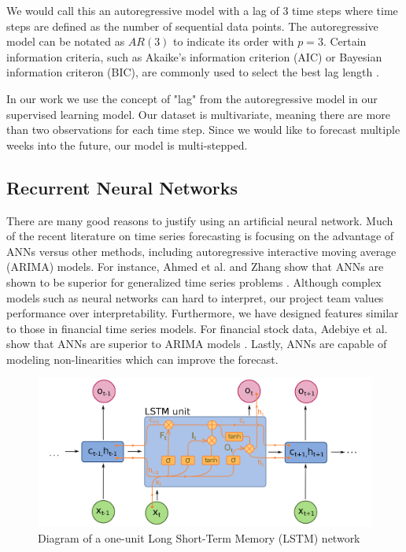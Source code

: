 \documentclass[11pt, oneside]{report}
\begin{document}
We would call this an autoregressive model with a lag of 3 time steps where time steps are defined as the number of sequential data points. The autoregressive model can be notated as $AR(3)$ to indicate its order with $p=3$. Certain information criteria, such as Akaike's information criterion (AIC) or Bayesian information criteron (BIC), are commonly used to select the best lag length \cite{liew}.

In our work we use the concept of "lag" from the autoregressive model in our supervised learning model. Our dataset is multivariate, meaning there are more than two observations for each time step. Since we would like to forecast multiple weeks into the future, our model is multi-stepped.

\subsection{Recurrent Neural Networks}

There are many good reasons to justify using an artificial neural network. Much of the recent literature on time series forecasting is focusing on the advantage of ANNs versus other methods, including autoregressive interactive moving average (ARIMA) models. For instance, Ahmed et al. and Zhang show that ANNs are shown to be superior for generalized time series problems \cite{ahmed}. Although complex models such as neural networks can hard to interpret, our project team values performance over interpretability. Furthermore, we have designed features similar to those in financial time series models. For financial stock data, Adebiye et al. show that ANNs are superior to ARIMA models \cite{adebiye}. Lastly, ANNs are capable of modeling non-linearities which can improve the forecast.

\begin{figure}[h]
  \caption{Diagram of a one-unit Long Short-Term Memory (LSTM) network \cite{deloche}}
  \centering
  \includegraphics[width=12.5cm]{images/Long_Short-Term_Memory.png}
\end{figure}
\end{document}
